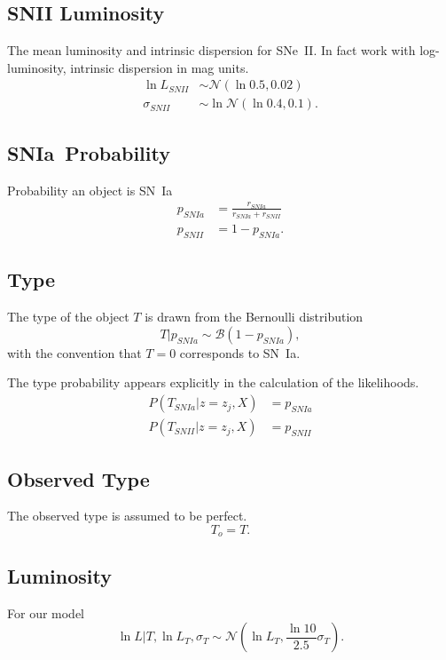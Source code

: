 \documentclass[preprint,3p]{elsarticle}
\begin{document}
\subsection{SNII Luminosity}
The mean luminosity and intrinsic dispersion for SNe~II. In fact work with log-luminosity, intrinsic
dispersion in mag units.
\begin{align}
\ln{L}_{SNII} & \sim \mathcal{N}(\ln{0.5}, 0.02) \\
\sigma_{SNII} & \sim \ln{\mathcal{N}}(\ln{0.4},0.1).
\end{align}

\subsection{SNIa~Probability}
Probability an object is SN~Ia
\begin{align}
p_{SNIa} &= \frac{r_{SNIa}}{r_{SNIa}+r_{SNII}} \nonumber \\
p_{SNII}&=1-p_{SNIa}.
\label{prob:eqn}
\end{align}
\subsection{Type}
The type of the object $T$ is drawn from the Bernoulli distribution 
\begin{equation}
T | p_{SNIa} \sim \mathcal{B}(1-p_{SNIa}),
\end{equation}
with the convention that $T=0$ corresponds to SN~Ia.

The type probability appears explicitly in the calculation of the likelihoods.
\begin{align}
P(T_{SNIa} | z=z_j, X) &= p_{SNIa}\\
P(T_{SNII} | z=z_j, X) &= p_{SNII}
\end{align}
\subsection{Observed Type}
The observed type is assumed to be perfect.
\begin{equation}
T_o = T.
\end{equation}

\subsection{Luminosity}
For our model
\begin{equation}
\ln{L} | T, \ln{L}_{T},\sigma_{T} \sim \mathcal{N}\left( \ln{L}_{T},\frac{\ln{10}}{2.5}\sigma_{T}\right).
\end{equation}
\end{document}
